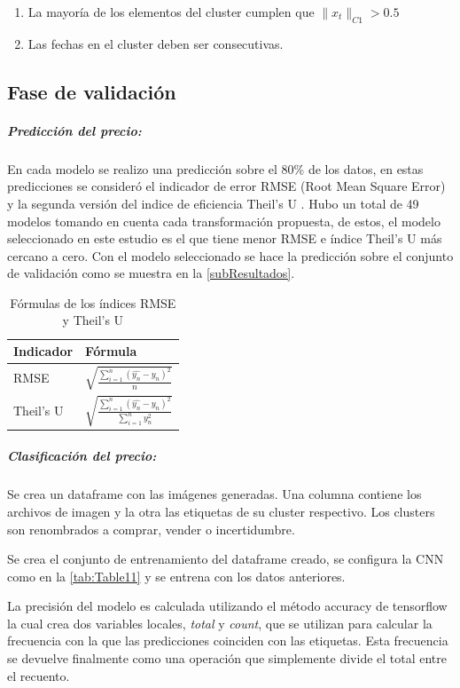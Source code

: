 \begin{enumerate}
	\item La mayoría de los elementos del cluster cumplen que $\lVert x_t \rVert_{C1} > 0.5$
	\item Las fechas en el cluster deben ser consecutivas.
\end{enumerate}


\subsection{Fase de validación}
\subparagraph{Predicción del precio:}
En cada modelo se realizo una predicción sobre el 80\% de los datos, en estas predicciones se consideró el indicador de error RMSE (Root Mean Square Error) y la segunda versión del indice de eficiencia Theil’s U \cite{bliemelTheilForecastAccuracy1973}.
Hubo un total de 49 modelos tomando en cuenta cada transformación propuesta, de estos, el modelo seleccionado en este estudio es el que tiene menor RMSE e índice Theil’s U más cercano a cero. Con el modelo seleccionado se hace la predicción sobre el conjunto de validación como se muestra en la \autoref{subResultados}.

\begin{table}[H]
	\centering
	{
		\begin{tabular}{ll}
			\toprule
			\textbf{Indicador} & \textbf{Fórmula}\\
			\midrule
			RMSE			&$\sqrt{\frac{\sum_{i=1}^{n}({\hat{y_{n}}} - y_{n})^{2}}{n}}$\\ 
			Theil’s U 	&$\sqrt{\frac{\sum_{i=1}^{n}({\hat{y_{n}}} - y_{n})^{2}}{\sum_{i=1}^{n}y_{n}^{2}}}$ \\
			
			\bottomrule
			\hline
	\end{tabular}} \quad
	\caption{Fórmulas de los índices RMSE y Theil’s U}
	\label{tab:Table12}
\end{table}

\subparagraph{Clasificación del precio:}
Se crea un dataframe con las imágenes generadas. Una columna contiene los archivos de imagen y la otra las etiquetas de su cluster respectivo. Los clusters son renombrados a comprar, vender o incertidumbre.

Se crea el conjunto de entrenamiento del dataframe creado, se configura la CNN como en la \autoref{tab:Table11} y se entrena con los datos anteriores.

La precisión del modelo es calculada utilizando el método accuracy de tensorflow la cual crea dos variables locales, \emph{total} y \emph{count}, que se utilizan para calcular la frecuencia con la que las predicciones coinciden con las etiquetas. Esta frecuencia se devuelve finalmente como una operación que simplemente divide el total entre el recuento.





